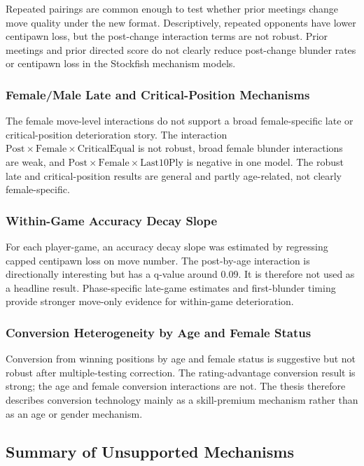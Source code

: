 Repeated pairings are common enough to test whether prior meetings change move quality under the new format. Descriptively, repeated opponents have lower centipawn loss, but the post-change interaction terms are not robust. Prior meetings and prior directed score do not clearly reduce post-change blunder rates or centipawn loss in the Stockfish mechanism models.

\subsubsection{Female/Male Late and Critical-Position Mechanisms}

The female move-level interactions do not support a broad female-specific late or critical-position deterioration story. The interaction \(\text{Post} \times \text{Female} \times \text{CriticalEqual}\) is not robust, broad female blunder interactions are weak, and \(\text{Post} \times \text{Female} \times \text{Last10Ply}\) is negative in one model. The robust late and critical-position results are general and partly age-related, not clearly female-specific.

\subsubsection{Within-Game Accuracy Decay Slope}

For each player-game, an accuracy decay slope was estimated by regressing capped centipawn loss on move number. The post-by-age interaction is directionally interesting but has a q-value around 0.09. It is therefore not used as a headline result. Phase-specific late-game estimates and first-blunder timing provide stronger move-only evidence for within-game deterioration.

\subsubsection{Conversion Heterogeneity by Age and Female Status}

Conversion from winning positions by age and female status is suggestive but not robust after multiple-testing correction. The rating-advantage conversion result is strong; the age and female conversion interactions are not. The thesis therefore describes conversion technology mainly as a skill-premium mechanism rather than as an age or gender mechanism.

\subsection{Summary of Unsupported Mechanisms}

